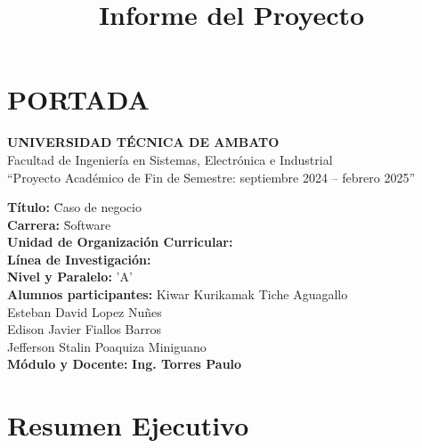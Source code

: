 \documentclass[a4paper,11pt]{article}
\title{Informe del Proyecto}
\begin{document}
\titleformat{\section}{\normalfont\Large\bfseries}{\thesection}{1em}{}
\renewcommand{\thesection}{\Roman{section}}

\section{PORTADA}
\begin{center} 
\textbf{UNIVERSIDAD TÉCNICA DE AMBATO} \\
Facultad de Ingeniería en Sistemas, Electrónica e Industrial \\
“Proyecto Académico de Fin de Semestre: septiembre 2024 – febrero 2025” \\
\end{center}

\begin{tabbing}
\textbf{Título:} \hspace{1cm} \= Caso de negocio \\
\textbf{Carrera:}\hspace{1cm} \= Software \\
\textbf{Unidad de Organización Curricular:} \hspace{1cm} \= \underline{\hspace{5cm}} \\
\textbf{Línea de Investigación:} \hspace{0,15cm} \= \underline{\hspace{5cm}} \\
\textbf{Nivel y Paralelo:}  'A' \\
\textbf{Alumnos participantes:} \> Kiwar Kurikamak Tiche Aguagallo \\ 
\>Esteban David Lopez Nuñes\\
\>Edison Javier Fiallos Barros\\
\>Jefferson Stalin Poaquiza Miniguano\\
\textbf{Módulo y Docente:} \> \underline{\hspace{5cm}} \textbf{Ing. Torres Paulo}
\end{tabbing}

\section{Resumen Ejecutivo}
\titleformat{\section}{\normalfont\Large\bfseries}{\thesection}{1em}{}
\renewcommand{\thesection}{\arabic{section}}
\end{document}
